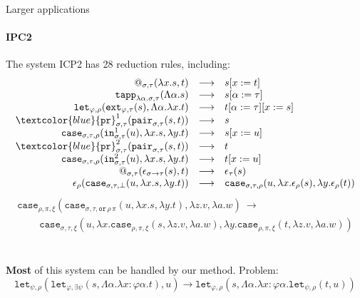 \documentclass[10pt,presentation,color=names]{beamer}
\newcommand{\arrtype}{\rightarrow}
\newcommand{\abs}[2]{\lambda #1.#2}
\newcommand{\tabs}[2]{\Lambda #1.#2}
\newcommand{\red}{\longrightarrow}
\newcommand{\symb}[1]{\textcolor{blue}{\mathtt{#1}}}
\newcommand{\proj}{\symb{pr}}
\begin{document}
\begin{frame}{Larger applications}
\framesubtitle{IPC2}
The system ICP2 has 28 reduction rules, including:
\[
\begin{array}{rcl}
@_{\sigma,\tau}(\abs{x}{s},t) & \red & s[x:=t] \\

\mathtt{tapp}_{\abs{\alpha}{\sigma},\tau}(\tabs{\alpha}{s}) & \red &
  s[\alpha:=\tau] \\
\mathtt{let}_{\varphi,\rho}(\mathtt{ext}_{\varphi,\tau}(s),\tabs{\alpha}{\abs{x}{t}}) & \red & t[\alpha:=\tau][x:=s] \\

\proj^1_{\sigma,\tau}(\mathtt{pair}_{\sigma,\tau}(s,t)) & \red & s \\
\!\!\!\!\!\!\!
\mathtt{case}_{\sigma,\tau,\rho}(\mathtt{in}^1_{\sigma,\tau}(u),
  \abs{x}{s},\abs{y}{t}) & \red & s[x:=u] \\

\proj^2_{\sigma,\tau}(\mathtt{pair}_{\sigma,\tau}(s,t)) & \red & t  \\
\!\!\!\!\!\!\!
\mathtt{case}_{\sigma,\tau,\rho}(\mathtt{in}^2_{\sigma,\tau}(u),
  \abs{x}{s},\abs{y}{t}) & \red & t[x:=u] \\
@_{\sigma,\tau}(\epsilon_{\sigma \arrtype \tau}(s),t) &\red&
  \epsilon_\tau(s) \\
\epsilon_\rho(\mathtt{case}_{\sigma,\tau,\bot}(u,\abs{x}{s},
  \abs{y}{t})) &\red&
  \mathtt{case}_{\sigma,\tau,\rho}(u,\abs{x}{\epsilon_\rho(s)},
  \abs{y}{\epsilon_\rho(t)}) \\
\end{array}
\]
\[
\begin{array}{ll}
\mathtt{case}_{\rho,\pi,\xi}(\mathtt{case}_{\sigma,\tau,\mathtt{or}\,
  \rho\,\pi}(u,\abs{x}{s},\abs{y}{t}),\abs{z}{v},
  \abs{a}{w})\ \red \\
  \phantom{ABC}
  \mathtt{case}_{\sigma,\tau,\xi}(u,\abs{x}{\mathtt{case}_{
  \rho,\pi,\xi}(s,\abs{z}{v},\abs{a}{w})},
  \abs{y}{\mathtt{case}_{\rho,\pi,\xi}(t,\abs{z}{v},
  \abs{a}{w})}) \\
\end{array}
\]

\ \\\pause
\textbf{Most} of this system can be handled by our method. Problem:
\[
\mathtt{let}_{\psi,\rho}(\mathtt{let}_{\varphi,\exists\psi}(s,
  \tabs{\alpha}{\abs{x:\varphi\alpha}{t}}),u) \red
  \mathtt{let}_{\varphi,\rho}(s,\tabs{\alpha}{\abs{x:
  \varphi\alpha}{\mathtt{let}_{\psi,\rho}(t,u)}})
\]
\end{frame}
\end{document}
